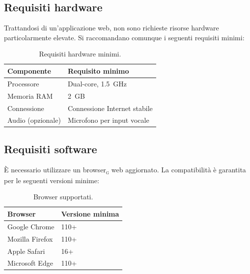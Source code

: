 \documentclass[a4paper, 11pt, oneside]{scrartcl}
\begin{document}
\subsection{Requisiti hardware}
Trattandosi di un'applicazione web, non sono richieste risorse hardware particolarmente elevate. Si raccomandano comunque i seguenti requisiti minimi:

\begin{table}[H]
    \centering
    \renewcommand{\arraystretch}{1.2}
    \begin{tabular}{ll}
        \toprule
        \textbf{Componente} & \textbf{Requisito minimo} \\
        \midrule
        Processore  & Dual-core, 1.5~GHz \\
        Memoria RAM & 2~GB \\
        Connessione & Connessione Internet stabile \\
        Audio (opzionale) & Microfono per input vocale \\
        \bottomrule
    \end{tabular}
    \caption{Requisiti hardware minimi.}
    \label{tab:req-hw}
\end{table}

\subsection{Requisiti software}
\`E necessario utilizzare un browser\textsubscript{\textsc{g}} web aggiornato. La compatibilit\`a \`e garantita per le seguenti versioni minime:

\begin{table}[H]
    \centering
    \renewcommand{\arraystretch}{1.2}
    \begin{tabular}{ll}
        \toprule
        \textbf{Browser} & \textbf{Versione minima} \\
        \midrule
        Google Chrome   & 110+ \\
        Mozilla Firefox & 110+ \\
        Apple Safari    & 16+ \\
        Microsoft Edge  & 110+ \\
        \bottomrule
    \end{tabular}
    \caption{Browser supportati.}
    \label{tab:req-browser}
\end{table}
\end{document}
